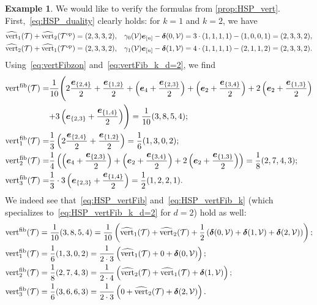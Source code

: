 \documentclass[11pt]{amsart}
\theoremstyle{plain}
\theoremstyle{definition}
\newtheorem{example}[theorem]{Example}
\def\V{\mathcal{V}}
\def\ddelta{\bm{\delta}}
\def\e{{\bm{e}}}
\newcommand\wh[1]{\hstretch{2}{\hat{\hstretch{0.5}{#1}}}}
\def\vert{\mathrm{vert}}
\def\vertHSP{\wh\vert}
\def\vertHSP{\widehat{\vert}}
\def\vertFib{\vert^\fiber}
\def\fiber{{\operatorname{fib}}}
\def\VC{\V}
\def\Tcal{\mathcal{T}}
\def\Tiling{\Tcal}
\begin{document}
\begin{example}
We would like to verify the formulas from \cref{prop:HSP_vert}. First,~\eqref{eq:HSP_duality} clearly holds: for $k=1$ and $k=2$, we have 
\begin{align*}
\vertHSP_1(\Tiling)+\vertHSP_2(\TilingOP)&=\vect2332, &\gamma_0(\VC)\e_{[n]}-\ddelta(0,\VC)&=3\cdot \vect1111-\vect1001=\vect2332,\\
\vertHSP_2(\Tiling)+\vertHSP_1(\TilingOP)&=\vect2332, &\gamma_1(\VC)\e_{[n]}-\ddelta(1,\VC)&=4\cdot \vect1111-\vect2112=\vect2332.
\end{align*}
\def\ee#1{\e_{\{#1\}}}
Using~\eqref{eq:vertFibzon} and~\eqref{eq:vertFib_k_d=2}, we find
\begin{align*}
  \vertFib(\Tiling)=&\frac1{10} \Biggl(2 \frac{\e_{\{2,4\}}}2+\frac{\e_{\{1,2\}}}2+ \left(\e_4+\frac{\e_{\{2,3\}}}2\right)+\left(\e_2+\frac{\e_{\{3,4\}}}2\right)+2\left(\e_2+\frac{\e_{\{1,3\}}}2\right)
\Biggr.\\
 &\Biggl.+3 \left(\e_{\{2,3\}}+\frac{\e_{\{1,4\}}}2\right)\Biggr)=\frac1{10}\vect3854;\\
  \vertFib_1(\Tiling)=&\frac1{3}   \left(2\frac{\ee{2,4}}2+\frac{\ee{1,2}}2 \right)=\frac16\vect1302;\\
  \vertFib_2(\Tiling)=&\frac1{4}   \left(\left(\e_4+\frac{\e_{\{2,3\}}}2\right)+\left(\e_2+\frac{\e_{\{3,4\}}}2\right)+2\left(\e_2+\frac{\e_{\{1,3\}}}2\right)\right)=\frac18\vect2743;\\
  \vertFib_3(\Tiling)=&\frac13\cdot 3 \left(\e_{\{2,3\}}+\frac{\e_{\{1,4\}}}2\right)=\frac12\vect1221.
\end{align*}
We indeed see that~\eqref{eq:HSP_vertFib}  and~\eqref{eq:HSP_vertFib_k} (which specializes to~\eqref{eq:HSP_vertFib_k_d=2} for $d=2$) hold as well:
\begin{align*} \vertFib(\Tiling)&=\frac1{10}\vect3854=\frac1{10}\left(\vertHSP_1(\Tiling)+\vertHSP_2(\Tiling)+\frac12 \left(\ddelta(0,\VC)+\ddelta(1,\VC)+\ddelta(2,\VC)\right)\right);\\
  \vertFib_1(\Tiling)&=\frac16\vect1302=\frac1{2\cdot 3} \left(\vertHSP_1(\Tiling)+0+\ddelta(0,\VC)\right);\\
  \vertFib_2(\Tiling)&=\frac18\vect2743=\frac1{2\cdot 4} \left(\vertHSP_2(\Tiling)+\vertHSP_1(\Tiling)+\ddelta(1,\VC)\right);\\
  \vertFib_3(\Tiling)&=\frac16\vect3663=\frac1{2\cdot 3} \left(0+\vertHSP_2(\Tiling)+\ddelta(2,\VC)\right).
\end{align*}
\end{example}
\end{document}
